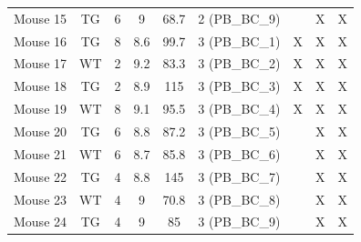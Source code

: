 \begin{landscape}
\begin{table}[]
{\begin{tabular}{@{}ccccccccc@{}}
	Mouse 15   & TG  & 6  & 9    & 68.7     & 2 (PB\_BC\_9)  &                  & X              & X                    \\
	Mouse 16   & TG  & 8  & 8.6  & 99.7     & 3 (PB\_BC\_1)  & X                & X              & X                    \\
	Mouse 17   & WT  & 2  & 9.2  & 83.3     & 3 (PB\_BC\_2)  & X                & X              & X                    \\
	Mouse 18   & TG  & 2  & 8.9  & 115      & 3 (PB\_BC\_3)  & X                & X              & X                    \\
	Mouse 19   & WT  & 8  & 9.1  & 95.5     & 3 (PB\_BC\_4)  & X                & X              & X                    \\
	Mouse 20   & TG  & 6  & 8.8  & 87.2     & 3 (PB\_BC\_5)  &                  & X              & X                    \\
	Mouse 21   & WT  & 6  & 8.7  & 85.8     & 3 (PB\_BC\_6)  &                  & X              & X                    \\
	Mouse 22   & TG  & 4  & 8.8  & 145      & 3 (PB\_BC\_7)  &                  & X              & X                    \\
	Mouse 23   & WT  & 4  & 9    & 70.8     & 3 (PB\_BC\_8)  &                  & X              & X                    \\
	Mouse 24   & TG  & 4  & 9    & 85       & 3 (PB\_BC\_9)  &                  & X              & X                    \\ \bottomrule
\end{tabular}%
}
\end{table}
\end{landscape}

